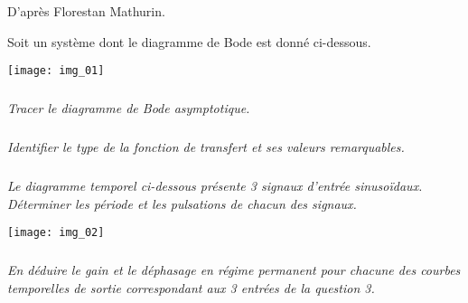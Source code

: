 \setcounter{exo}{0}
\begin{flushright}
D'après Florestan Mathurin.
\end{flushright}
\ifprof
\else
Soit un système dont le diagramme de Bode est donné ci-dessous.
\begin{center}
\texttt{[image: img\_01]}
\end{center}


\subparagraph{}
\textit{Tracer le diagramme de Bode asymptotique.}
\ifprof
\else
\fi


\subparagraph{}
\textit{Identifier le type de la fonction de transfert et ses valeurs remarquables.}


\subparagraph{}
\textit{Le diagramme temporel ci-dessous présente 3 signaux d'entrée sinusoïdaux. Déterminer les période et les pulsations de chacun des signaux. }


\begin{center}
\texttt{[image: img\_02]}
\end{center}


\ifprof
\else
\fi


\subparagraph{}
\textit{En déduire le gain et le déphasage en régime permanent pour chacune des courbes temporelles de sortie correspondant aux 3 entrées de la question 3. }
\ifprof
\else
\fi
